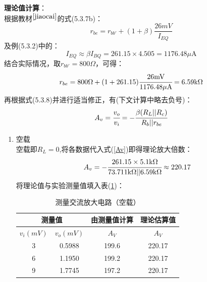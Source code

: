 \documentclass[a4paper]{article}
\begin{document}
\begin{enumerate}
\textbf{理论值计算}：\\
根据教材$^{\cite{jiaocai}}$的式(5.3.7b)：
\begin{equation}
r_{be} = r_{bb'} + (1+\beta)\frac{26mV}{I_{EQ}}\label{rbe}
\end{equation}
及例(5.3.2)中的：
\begin{equation}
I_{EQ} \approx \beta I_{BQ}=261.15\times4.505 =1176.48 \mu\text{A}
\end{equation}
结合实际情况，取$r_{bb'} = 800\Omega$，可得：
\begin{equation}
r_{be} = 800\Omega + (1+261.15)\cfrac{26\text{mV}}{1176.48 \mu\text{A}} = 6.59\text{k}\Omega
\end{equation}
再根据式(5.3.8)并进行适当修正，有(下文计算中略去负号)：
\begin{equation}
A_v = \cfrac{v_o}{v_i} = -\cfrac{\beta(R_L||R_c)}{R_b||r_{be}}\label{Av}
\end{equation}
\begin{enumerate}
\item 空载\\
空载即$R_L = 0$,将各数据代入式(\ref{Av})即得理论放大倍数：
\begin{equation}
A_v = -\cfrac{261.15\times5.1\text{k}\Omega}{73.711\text{k}\Omega || 6.59\text{k}\Omega} \approx 220.17
\end{equation}
将理论值与实验测量值填入表(\ref{table2})：
\begin{table}[!h]
\centering
\caption{测量交流放大电路（空载）}
\label{table2}
\begin{tabular}{c|c|c|c}
\hline
\multicolumn{2}{c|}{测量值} & 由测量值计算 & 理论估算值 \\ \hline
$v_i(mV)$   & $v_o(mV)$  & $A_V$  & $A_V$ \\ \hline
3                 & 0.5988         & 199.6    & 220.17      \\ \hline
6                 & 1.1950         & 199.2    & 220.17      \\ \hline
9                 & 1.7745         & 197.2    & 220.17      \\ \hline
\end{tabular}
\end{table}


\end{enumerate}
\end{enumerate}
\end{document}
